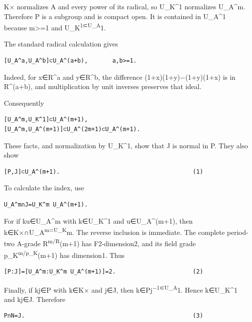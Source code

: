 K× normalizes A and every power of its radical, so U\_K\^{}1 normalizes
U\_A\^{}m. Therefore P is a subgroup and is compact open. It is
contained in U\_A\^{}1 because m\textgreater=1 and
U\_K\textsuperscript{1⊂U\_A}1.

The standard radical calculation gives

\begin{Verbatim}[fontsize=\small,breaklines=true,breakanywhere=true]
[U_A^a,U_A^b]⊂U_A^(a+b),       a,b>=1.
\end{Verbatim}

Indeed, for x∈R\^{}a and y∈R\^{}b, the difference (1+x)(1+y)−(1+y)(1+x)
is in R\^{}(a+b), and multiplication by unit inverses preserves that
ideal.

Consequently

\begin{Verbatim}[fontsize=\small,breaklines=true,breakanywhere=true]
[U_A^m,U_K^1]⊂U_A^(m+1),
[U_A^m,U_A^(m+1)]⊂U_A^(2m+1)⊂U_A^(m+1).
\end{Verbatim}

These facts, and normalization by U\_K\^{}1, show that J is normal in P.
They also show

\begin{Verbatim}[fontsize=\small,breaklines=true,breakanywhere=true]
[P,J]⊂U_A^(m+1).                                      (1)
\end{Verbatim}

To calculate the index, use

\begin{Verbatim}[fontsize=\small,breaklines=true,breakanywhere=true]
U_A^m∩J=U_K^m U_A^(m+1).
\end{Verbatim}

For if ku∈U\_A\^{}m with k∈U\_K\^{}1 and u∈U\_A\^{}(m+1), then
k∈K×∩U\_A\textsuperscript{m=U\_K}m. The reverse inclusion is immediate.
The complete period-two A-grade R\textsuperscript{m/R}(m+1) has
F2-dimension2, and its field grade p\_K\textsuperscript{m/p\_K}(m+1) has
dimension1. Thus

\begin{Verbatim}[fontsize=\small,breaklines=true,breakanywhere=true]
[P:J]=[U_A^m:U_K^m U_A^(m+1)]=2.                      (2)
\end{Verbatim}

Finally, if kj∈P with k∈K× and j∈J, then k∈Pj\textsuperscript{−1⊂U\_A}1.
Hence k∈U\_K\^{}1 and kj∈J. Therefore

\begin{Verbatim}[fontsize=\small,breaklines=true,breakanywhere=true]
P∩N=J.                                                (3)
\end{Verbatim}

